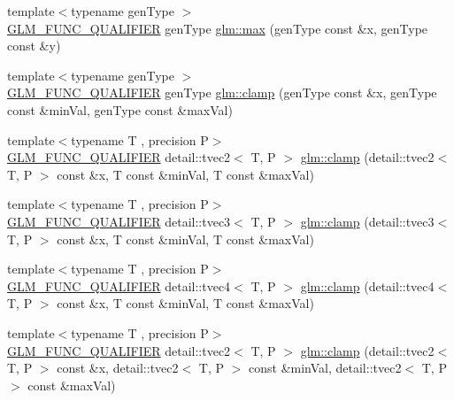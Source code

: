 \begin{DoxyCompactItemize}
\item 
{\footnotesize template$<$typename gen\+Type $>$ }\\\hyperlink{setup_8hpp_a33fdea6f91c5f834105f7415e2a64407}{G\+L\+M\+\_\+\+F\+U\+N\+C\+\_\+\+Q\+U\+A\+L\+I\+F\+I\+ER} gen\+Type \hyperlink{group__core__func__common_gaa228561a9da55898f8f72ad2403fafac}{glm\+::max} (gen\+Type const \&x, gen\+Type const \&y)
\item 
{\footnotesize template$<$typename gen\+Type $>$ }\\\hyperlink{setup_8hpp_a33fdea6f91c5f834105f7415e2a64407}{G\+L\+M\+\_\+\+F\+U\+N\+C\+\_\+\+Q\+U\+A\+L\+I\+F\+I\+ER} gen\+Type \hyperlink{group__core__func__common_ga72e9e213c84f06a329a2a838b51200f4}{glm\+::clamp} (gen\+Type const \&x, gen\+Type const \&min\+Val, gen\+Type const \&max\+Val)
\item 
{\footnotesize template$<$typename T , precision P$>$ }\\\hyperlink{setup_8hpp_a33fdea6f91c5f834105f7415e2a64407}{G\+L\+M\+\_\+\+F\+U\+N\+C\+\_\+\+Q\+U\+A\+L\+I\+F\+I\+ER} detail\+::tvec2$<$ T, P $>$ \hyperlink{namespaceglm_acfba9759719471fb9495f97046389339}{glm\+::clamp} (detail\+::tvec2$<$ T, P $>$ const \&x, T const \&min\+Val, T const \&max\+Val)
\item 
{\footnotesize template$<$typename T , precision P$>$ }\\\hyperlink{setup_8hpp_a33fdea6f91c5f834105f7415e2a64407}{G\+L\+M\+\_\+\+F\+U\+N\+C\+\_\+\+Q\+U\+A\+L\+I\+F\+I\+ER} detail\+::tvec3$<$ T, P $>$ \hyperlink{namespaceglm_a5480cd78f9efc725f850ea4f239bfd2d}{glm\+::clamp} (detail\+::tvec3$<$ T, P $>$ const \&x, T const \&min\+Val, T const \&max\+Val)
\item 
{\footnotesize template$<$typename T , precision P$>$ }\\\hyperlink{setup_8hpp_a33fdea6f91c5f834105f7415e2a64407}{G\+L\+M\+\_\+\+F\+U\+N\+C\+\_\+\+Q\+U\+A\+L\+I\+F\+I\+ER} detail\+::tvec4$<$ T, P $>$ \hyperlink{namespaceglm_ada0741f13869762e0238572ba8c79d4a}{glm\+::clamp} (detail\+::tvec4$<$ T, P $>$ const \&x, T const \&min\+Val, T const \&max\+Val)
\item 
{\footnotesize template$<$typename T , precision P$>$ }\\\hyperlink{setup_8hpp_a33fdea6f91c5f834105f7415e2a64407}{G\+L\+M\+\_\+\+F\+U\+N\+C\+\_\+\+Q\+U\+A\+L\+I\+F\+I\+ER} detail\+::tvec2$<$ T, P $>$ \hyperlink{namespaceglm_a3619aef4490284ac6ca86a552652c143}{glm\+::clamp} (detail\+::tvec2$<$ T, P $>$ const \&x, detail\+::tvec2$<$ T, P $>$ const \&min\+Val, detail\+::tvec2$<$ T, P $>$ const \&max\+Val)

\end{DoxyCompactItemize}
